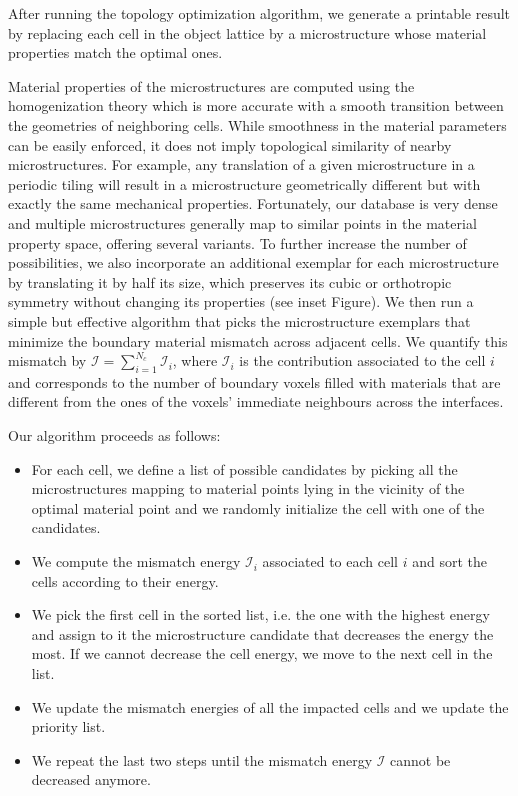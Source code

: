 After running the topology optimization algorithm, we generate a printable result by replacing each cell in the object lattice by a microstructure whose material properties match the optimal ones.

Material properties of the microstructures are computed using the homogenization theory which is more accurate with a smooth transition between the geometries of neighboring cells.
While smoothness in the material parameters can be easily enforced, it does not imply topological similarity of nearby microstructures. 
For example, any translation of a given microstructure in a periodic tiling will result in a microstructure geometrically different but with exactly the same mechanical properties. 
Fortunately, our database is very dense and multiple microstructures generally map to similar points in the material property space, offering several variants. To further increase the number of possibilities, we also incorporate an additional exemplar for each microstructure by translating it by half its size, which preserves its cubic or orthotropic symmetry without changing its properties (see inset Figure). We then run a simple but effective algorithm that picks the microstructure exemplars that minimize the boundary material mismatch across adjacent cells. We quantify this mismatch by $\mathcal{I}=\sum_{i=1}^{N_c} \mathcal{I}_i$, where $\mathcal{I}_i$ is the contribution associated to the cell $i$ and corresponds to the number of boundary voxels filled with materials that are different from the ones of the voxels' immediate neighbours across the interfaces.

Our algorithm proceeds as follows:
\begin{itemize}
\item For each cell, we define a list of possible candidates by picking all the microstructures mapping to material points lying in the vicinity of the optimal material point and we randomly initialize the cell with one of the candidates.
\item We compute the mismatch energy $\mathcal{I}_i$ associated to each cell $i$ and sort the cells according to their energy. 
\item We pick the first cell in the sorted list, i.e. the one with the highest energy and assign to it the microstructure candidate that decreases the energy the most. If we cannot decrease the cell energy, we move to the next cell in the list.
\item We update the mismatch energies of all the impacted cells and we update the priority list.
\item We repeat the last two steps until the mismatch energy $\mathcal{I}$ cannot be decreased anymore.
\end{itemize}

